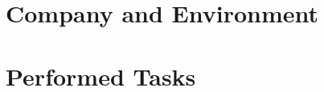 














\setcounter{tocdepth}{1}
\tableofcontents


\listoffigures


\listoftables










\part{Company and Environment}








\part{Performed Tasks}

